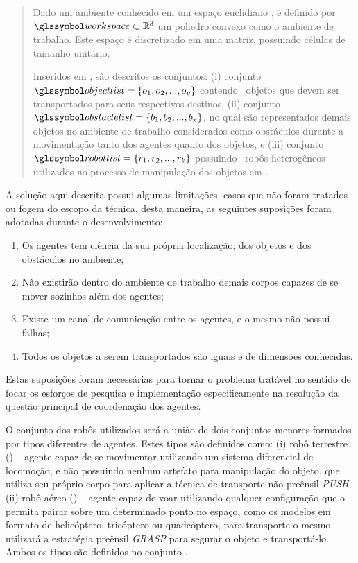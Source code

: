 \begin{quotation}
  Dado um ambiente conhecido em um espaço euclidiano \environment, é definido por $\sy{workspace} \subset \environment$ um poliedro convexo como o ambiente de trabalho.
  Este espaço é discretizado em uma matriz, possuindo células  de tamanho unitário.


  Inseridos em , são descritos os conjuntos: (i) conjunto $\sy{objectlist} = \objectlistdef$ contendo \objectsetqt\ objetos que devem ser transportados para seus respectivos destinos, (ii) conjunto $\sy{obstaclelist} = \obstaclelistdef$, no qual são representados demais objetos no ambiente de trabalho considerados como obstáculos durante a movimentação tanto dos agentes quanto dos objetos, e (iii) conjunto $\sy{robotlist} = \robotlistdef$ possuindo \robotsetqt\ robôs heterogêneos utilizados no processo de manipulação dos objetos em .
\end{quotation}

A solução aqui descrita possui algumas limitações, casos que não foram tratados ou fogem do escopo da técnica, desta maneira, as seguintes suposições foram adotadas durante o desenvolvimento:

\begin{enumerate}
  \item Os agentes tem ciência da sua própria localização, dos objetos e dos obstáculos no ambiente;
  \item Não existirão dentro do ambiente de trabalho  demais corpos capazes de se mover sozinhos além dos agentes;
  \item Existe um canal de comunicação entre os agentes, e o mesmo não possui falhas;
  \item Todos os objetos a serem transportados são iguais e de dimensões conhecidas.
\end{enumerate}

Estas suposições foram necessárias para tornar o problema tratável no sentido de focar os esforços de pesquisa e implementação especificamente na resolução da questão principal de coordenação dos agentes.

O conjunto  dos robôs utilizados será a união de dois conjuntos menores formados por tipos diferentes de agentes.
Estes tipos são definidos como:
(i) robô terrestre (\emph{\typeland}) -- agente capaz de se movimentar utilizando um sistema diferencial de locomoção, e não possuindo nenhum artefato para manipulação do objeto, que utiliza seu próprio corpo para aplicar a técnica de transporte não-preênsil \emph{PUSH},
(ii) robô aéreo (\emph{\typeaerial}) -- agente capaz de voar utilizando qualquer configuração que o permita pairar sobre um determinado ponto no espaço, como os modelos em formato de helicóptero, tricóptero ou quadcóptero, para transporte o mesmo utilizará a estratégia preênsil \emph{GRASP} para segurar o objeto e transportá-lo.
Ambos os tipos são definidos no conjunto \typelist.

